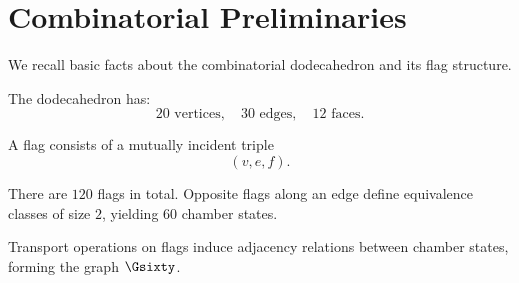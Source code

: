 \section{Combinatorial Preliminaries}

We recall basic facts about the combinatorial dodecahedron and its flag
structure.

The dodecahedron has:
\[
20 \text{ vertices}, \quad 30 \text{ edges}, \quad 12 \text{ faces}.
\]

A flag consists of a mutually incident triple
\[
(v,e,f).
\]

There are $120$ flags in total. Opposite flags along an edge define
equivalence classes of size $2$, yielding $60$ chamber states.

Transport operations on flags induce adjacency relations between chamber
states, forming the graph $\Gsixty$.
